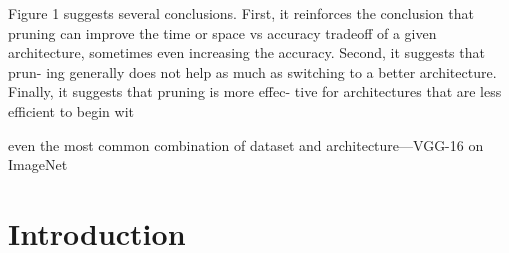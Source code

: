 \documentclass{article}
\begin{document}
Figure 1 suggests several conclusions. First, it reinforces the conclusion that pruning can improve the time or space vs accuracy tradeoff of a given architecture, sometimes even increasing the accuracy. Second, it suggests that prun- ing generally does not help as much as switching to a better architecture. Finally, it suggests that pruning is more effec- tive for architectures that are less efficient to begin wit

even the most common combination of dataset and architecture—VGG-16 on ImageNet
\section{Introduction}


\end{document}
